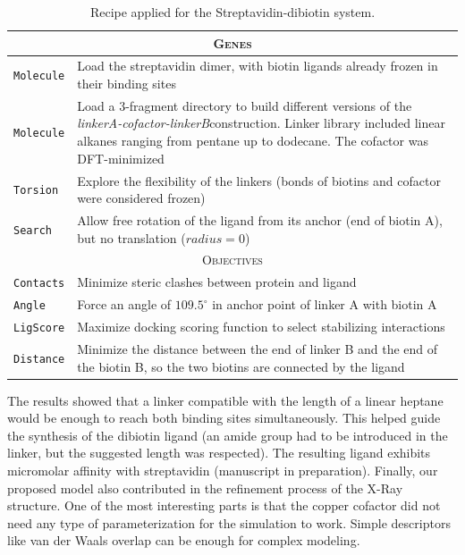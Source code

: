 \begin{table}[hbtp]
	\caption[Recipe applied for the Streptavidin-dibiotin system]{Recipe applied for the Streptavidin-dibiotin system.}
	\label{table:strep-recipe}
	\footnotesize
	\newcommand{\tableheading}[1]{\multicolumn{2}{c}{\textsc{#1}}}
	\begin{tabularx}{\textwidth}{RL}
		\toprule
		\tableheading{Genes}\\
		\toprule
		\texttt{Molecule} & Load the streptavidin dimer, with biotin ligands already frozen in their binding sites  \\
		\midrule
		\texttt{Molecule} & Load a 3-fragment directory to build different versions of the \textit{linkerA-cofactor-linkerB}construction. Linker library included linear alkanes ranging from pentane up to dodecane. The cofactor was DFT-minimized \\
		\midrule
		\texttt{Torsion} & Explore the flexibility of the linkers (bonds of biotins and cofactor were considered frozen) \\
		\midrule
		\texttt{Search} & Allow free rotation of the ligand from its anchor (end of biotin A), but no translation ($radius=0$) \\
		\toprule
		\tableheading{Objectives}\\
		\toprule
		\texttt{Contacts} & Minimize steric clashes between protein and ligand \\
		\midrule
		\texttt{Angle} & Force an angle of $109.5^\circ$ in anchor point of linker A with biotin A \\
		\midrule
		\texttt{LigScore} & Maximize docking scoring function to select stabilizing interactions \\
		\midrule
		\texttt{Distance} & Minimize the distance between the end of linker B and the end of the biotin B, so the two biotins are connected by the ligand \\
		\bottomrule
	\end{tabularx}
\end{table}

The results showed that a linker compatible with the length of a linear heptane would be enough to reach both binding sites simultaneously. This helped guide the synthesis of the dibiotin ligand (an amide group had to be introduced in the linker, but the suggested length was respected). The resulting ligand exhibits micromolar affinity with streptavidin (manuscript in preparation). Finally, our proposed model also contributed in the refinement process of the X-Ray structure. One of the most interesting parts is that the copper cofactor did not need any type of parameterization for the simulation to work. Simple descriptors like van der Waals overlap can be enough for complex modeling.

